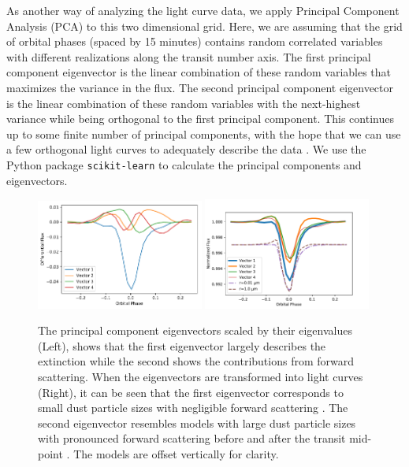 \documentclass[preprint]{aastex61}
\begin{document}
As another way of analyzing the light curve data, we apply Principal Component Analysis (PCA) to this two dimensional grid.
Here, we are assuming that the grid of orbital phases (spaced by 15 minutes) contains random correlated variables with different realizations along the transit number axis.
The first principal component eigenvector is the linear combination of these random variables that maximizes the variance in the flux.
The second principal component eigenvector is the linear combination of these random variables with the next-highest variance while being orthogonal to the first principal component.
This continues up to some finite number of principal components, with the hope that we can use a few orthogonal light curves to adequately describe the data \citep[e.g.][]{jolliffe2002pca}.
We use the Python package \texttt{scikit-learn} \citep{pedregosa2011scikit-learn} to calculate the principal components and eigenvectors.
\begin{figure}[!hbtp]
\begin{centering}
\includegraphics[width=0.49\textwidth]{images/kepler/pca_k1255.pdf}
\includegraphics[width=0.49\textwidth]{images/kepler/pca_k1255_transformed.pdf}
\caption{The principal component eigenvectors scaled by their eigenvalues (Left), shows that the first eigenvector largely describes the extinction while the second shows the contributions from forward scattering.
When the eigenvectors are transformed into light curves (Right), it can be seen that the first eigenvector corresponds to small dust particle sizes with negligible forward scattering \citep[dash-dot purple model][]{budaj12}.
The second eigenvector resembles models with large dust particle sizes with pronounced forward scattering before and after the transit mid-point \citep[dashed brown model][]{budaj12}.
The models are offset vertically for clarity.
}\label{fig:pcaVectorsComp}
\end{centering}
\end{figure}
\end{document}
